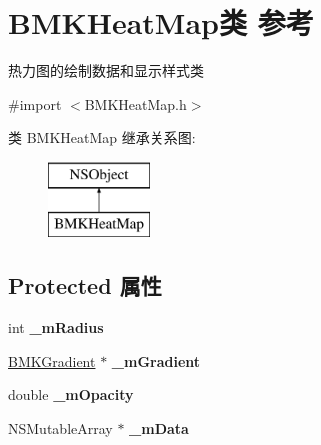 \hypertarget{interface_b_m_k_heat_map}{}\section{B\+M\+K\+Heat\+Map类 参考}
\label{interface_b_m_k_heat_map}


热力图的绘制数据和显示样式类  




{\ttfamily \#import $<$B\+M\+K\+Heat\+Map.\+h$>$}

类 B\+M\+K\+Heat\+Map 继承关系图\+:\begin{figure}[H]
\begin{center}
\leavevmode
\includegraphics[height=2.000000cm]{interface_b_m_k_heat_map}
\end{center}
\end{figure}
\subsection*{Protected 属性}
\begin{DoxyCompactItemize}
\item 
\hypertarget{interface_b_m_k_heat_map_a70ff8c509134292bfd1b111196041085}{}int {\bfseries \+\_\+m\+Radius}\label{interface_b_m_k_heat_map_a70ff8c509134292bfd1b111196041085}

\item 
\hypertarget{interface_b_m_k_heat_map_a5cb9c9b8c4e4abad710abca27b2b3ec1}{}\hyperlink{interface_b_m_k_gradient}{B\+M\+K\+Gradient} $\ast$ {\bfseries \+\_\+m\+Gradient}\label{interface_b_m_k_heat_map_a5cb9c9b8c4e4abad710abca27b2b3ec1}

\item 
\hypertarget{interface_b_m_k_heat_map_ab1a2aac49094b1fb6c53ab09f9fc999d}{}double {\bfseries \+\_\+m\+Opacity}\label{interface_b_m_k_heat_map_ab1a2aac49094b1fb6c53ab09f9fc999d}

\item 
\hypertarget{interface_b_m_k_heat_map_a201c72e6cb01fec1eb1af4315b2508ba}{}N\+S\+Mutable\+Array $\ast$ {\bfseries \+\_\+m\+Data}\label{interface_b_m_k_heat_map_a201c72e6cb01fec1eb1af4315b2508ba}

\end{DoxyCompactItemize}

